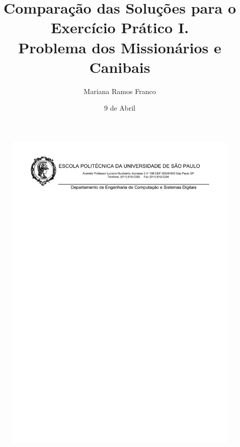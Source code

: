 \documentclass[12pt,a4paper]{article}
\begin{document}
\begin{figure}[!t]
\centering 
\includegraphics[width=15.5cm]{images/logo.pdf}
\end{figure}

\title{Comparação das Soluções para o Exercício Prático I.\\
		Problema dos Missionários e Canibais}
\author{Mariana Ramos Franco}
\date{9 de Abril}

\maketitle
\end{document}

